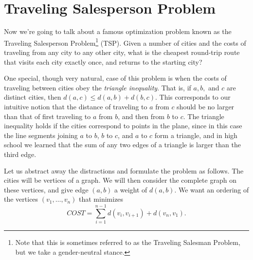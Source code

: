 \documentclass[12pt]{article}
\begin{document}


\section{Traveling Salesperson Problem}
Now we're going to talk about a famous optimization problem known as the Traveling Salesperson Problem\footnote{Note that this is sometimes referred to as the Traveling Salesman Problem, but we take a gender-neutral stance.} (TSP). Given a number of cities and the costs of traveling from any city to any other city, what is the cheapest round-trip route that visits each city exactly once, and returns to the starting city?

One special, though very natural, case of this problem is when the costs of traveling between cities obey the {\it triangle inequality}. That is, if $a,b,$ and $c$ are distinct cities, then $d(a,c) \leq d(a,b) + d(b,c)$. This corresponds to our intuitive notion that the distance of traveling to $a$ from $c$ should be no larger than that of first traveling to $a$ from $b$, and then from $b$ to $c$. The triangle inequality holds if the cities correspond to points in the plane, since in this case the line segments joining $a$ to $b$, $b$ to $c$, and $a$ to $c$ form a triangle, and in high school we learned that the sum of any two edges of a triangle is larger than the third edge. 

Let us abstract away the distractions and formulate the problem as follows. The cities will be vertices of a graph. We will then consider the complete graph on these vertices, and give edge $(a,b)$ a weight of $d(a,b)$. We want an ordering of the vertices $(v_1, \ldots, v_n)$ that minimizes $$COST = \sum_{i=1}^{n-1} d(v_i, v_{i+1}) + d(v_n, v_1).$$
\end{document}
